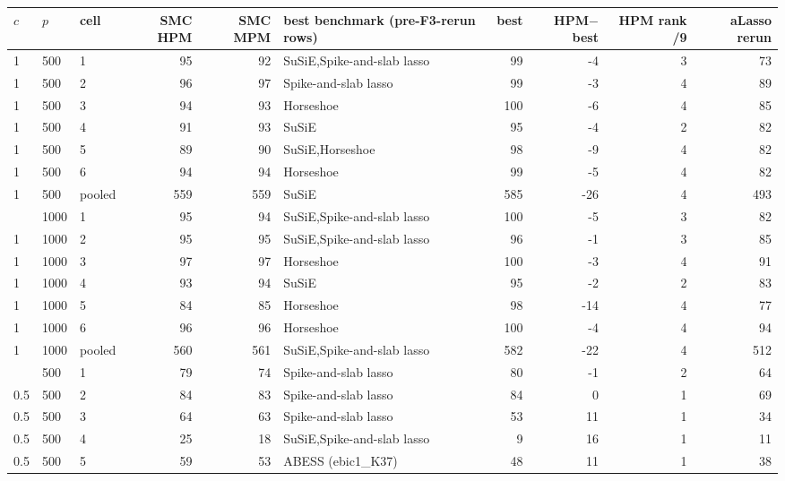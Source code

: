 \begin{center}
\scriptsize
\setlength{\tabcolsep}{2.6pt}
\begin{adjustbox}{max width=\linewidth}
\begin{tabular}{lllrrp{4.4cm}rrrr}
\toprule
$c$ & $p$ & cell & SMC HPM & SMC MPM & best benchmark (pre-F3-rerun rows) & best & HPM$-$best & HPM rank /9 & aLasso rerun \\
\midrule
1 & 500 & 1 & 95 & 92 & SuSiE,Spike-and-slab lasso & 99 & -4 & 3 & 73 \\
1 & 500 & 2 & 96 & 97 & Spike-and-slab lasso & 99 & -3 & 4 & 89 \\
1 & 500 & 3 & 94 & 93 & Horseshoe & 100 & -6 & 4 & 85 \\
1 & 500 & 4 & 91 & 93 & SuSiE & 95 & -4 & 2 & 82 \\
1 & 500 & 5 & 89 & 90 & SuSiE,Horseshoe & 98 & -9 & 4 & 82 \\
1 & 500 & 6 & 94 & 94 & Horseshoe & 99 & -5 & 4 & 82 \\
1 & 500 & pooled & 559 & 559 & SuSiE & 585 & -26 & 4 & 493 \\
\addlinespace
1 & 1000 & 1 & 95 & 94 & SuSiE,Spike-and-slab lasso & 100 & -5 & 3 & 82 \\
1 & 1000 & 2 & 95 & 95 & SuSiE,Spike-and-slab lasso & 96 & -1 & 3 & 85 \\
1 & 1000 & 3 & 97 & 97 & Horseshoe & 100 & -3 & 4 & 91 \\
1 & 1000 & 4 & 93 & 94 & SuSiE & 95 & -2 & 2 & 83 \\
1 & 1000 & 5 & 84 & 85 & Horseshoe & 98 & -14 & 4 & 77 \\
1 & 1000 & 6 & 96 & 96 & Horseshoe & 100 & -4 & 4 & 94 \\
1 & 1000 & pooled & 560 & 561 & SuSiE,Spike-and-slab lasso & 582 & -22 & 4 & 512 \\
\addlinespace
0.5 & 500 & 1 & 79 & 74 & Spike-and-slab lasso & 80 & -1 & 2 & 64 \\
0.5 & 500 & 2 & 84 & 83 & Spike-and-slab lasso & 84 & 0 & 1 & 69 \\
0.5 & 500 & 3 & 64 & 63 & Spike-and-slab lasso & 53 & 11 & 1 & 34 \\
0.5 & 500 & 4 & 25 & 18 & SuSiE,Spike-and-slab lasso & 9 & 16 & 1 & 11 \\
0.5 & 500 & 5 & 59 & 53 & ABESS (ebic1\_K37) & 48 & 11 & 1 & 38 \\

\end{tabular}
\end{adjustbox}
\end{center}
